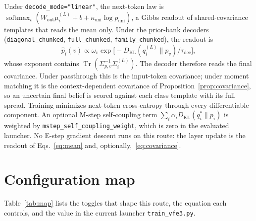 \documentclass[11pt]{article}
\theoremstyle{definition}
\theoremstyle{remark}
\newcommand{\KL}{D_{\mathrm{KL}}}
\newcommand{\softmax}{\operatorname{softmax}}
\newcommand{\Tr}{\operatorname{Tr}}
\newcommand{\cfg}[1]{\texttt{#1}}
\begin{document}
Under \cfg{decode\_mode="linear"}, the next-token law is $\softmax_v(W_{\mathrm{out}}\mu_i^{(L)}+b+\kappa_{\mathrm{uni}}\log p_{\mathrm{uni}})$, a Gibbs readout of shared-covariance templates that reads the mean only. Under the prior-bank decoders (\cfg{diagonal\_chunked}, \cfg{full\_chunked}, \cfg{family\_chunked}), the readout is
\begin{equation}
\hat p_i(v)\propto\omega_v\exp\bigl[-\KL(q_i^{(L)}\|p_v)/\tau_{\mathrm{dec}}\bigr],
\label{eq:decode}
\end{equation}
whose exponent contains $\Tr(\Sigma_{p,v}^{-1}\Sigma_i^{(L)})$. The decoder therefore reads the final covariance. Under passthrough this is the input-token covariance; under moment matching it is the context-dependent covariance of Proposition~\ref{prop:covariance}, so an uncertain final belief is scored against each class template with its full spread. Training minimizes next-token cross-entropy through every differentiable component. An optional M-step self-coupling term $\sum_i\alpha_i\KL(q_i^{*}\|p_i)$ is weighted by \cfg{mstep\_self\_coupling\_weight}, which is zero in the evaluated launcher. No E-step gradient descent runs on this route: the layer update is the readout of Eqs.~\eqref{eq:mean} and, optionally,~\eqref{eq:covariance}.

\section{Configuration map}
\label{sec:map}

Table~\ref{tab:map} lists the toggles that shape this route, the equation each controls, and the value in the current launcher \cfg{train\_vfe3.py}.
\end{document}
